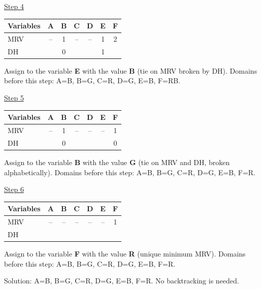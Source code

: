 \documentclass[11pt,a4paper]{article}
\begin{document}
\begin{solbox}
\underline{Step 4}\par\begin{center}\small \begin{tabular}{|l|c|c|c|c|c|c|}\hline Variables & \textbf{A} & \textbf{B} & \textbf{C} & \textbf{D} & \textbf{E} & \textbf{F}\\ \hline MRV & -- & \textcolor{blue!60!black}{1} & -- & -- & \textcolor{blue!60!black}{1} & \textcolor{blue!60!black}{2}\\ \hline DH &  & \textcolor{blue!60!black}{0} &  &  & \textcolor{blue!60!black}{1} & \\ \hline\end{tabular}\end{center}Assign to the variable \textbf{E} with the value \textbf{B} (tie on MRV broken by DH). Domains before this step: A=B, B=G, C=R, D=G, E=B, F=RB.\par
\underline{Step 5}\par\begin{center}\small \begin{tabular}{|l|c|c|c|c|c|c|}\hline Variables & \textbf{A} & \textbf{B} & \textbf{C} & \textbf{D} & \textbf{E} & \textbf{F}\\ \hline MRV & -- & \textcolor{blue!60!black}{1} & -- & -- & -- & \textcolor{blue!60!black}{1}\\ \hline DH &  & \textcolor{blue!60!black}{0} &  &  &  & \textcolor{blue!60!black}{0}\\ \hline\end{tabular}\end{center}Assign to the variable \textbf{B} with the value \textbf{G} (tie on MRV and DH, broken alphabetically). Domains before this step: A=B, B=G, C=R, D=G, E=B, F=R.\par
\underline{Step 6}\par\begin{center}\small \begin{tabular}{|l|c|c|c|c|c|c|}\hline Variables & \textbf{A} & \textbf{B} & \textbf{C} & \textbf{D} & \textbf{E} & \textbf{F}\\ \hline MRV & -- & -- & -- & -- & -- & \textcolor{blue!60!black}{1}\\ \hline DH &  &  &  &  &  & \\ \hline\end{tabular}\end{center}Assign to the variable \textbf{F} with the value \textbf{R} (unique minimum MRV). Domains before this step: A=B, B=G, C=R, D=G, E=B, F=R.\par Solution: A=B, B=G, C=R, D=G, E=B, F=R. No backtracking is needed.
\end{solbox}
\end{document}
